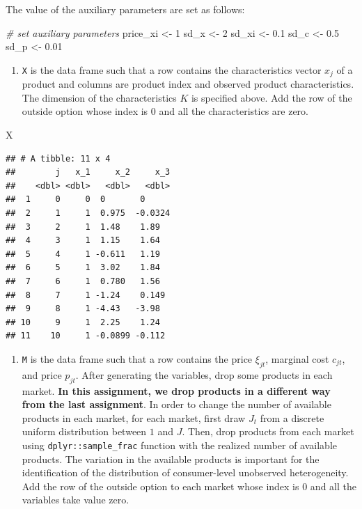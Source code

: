 \documentclass[
]{book}
\newenvironment{Shaded}{\begin{snugshade}}{\end{snugshade}}
\newcommand{\CommentTok}[1]{\textcolor[rgb]{0.56,0.35,0.01}{\textit{#1}}}
\newcommand{\DecValTok}[1]{\textcolor[rgb]{0.00,0.00,0.81}{#1}}
\newcommand{\FloatTok}[1]{\textcolor[rgb]{0.00,0.00,0.81}{#1}}
\newcommand{\NormalTok}[1]{#1}
\newcommand{\OtherTok}[1]{\textcolor[rgb]{0.56,0.35,0.01}{#1}}
\providecommand{\tightlist}{%
  \setlength{\itemsep}{0pt}\setlength{\parskip}{0pt}}
\begin{document}
The value of the auxiliary parameters are set as follows:

\begin{Shaded}
\begin{Highlighting}[]
\CommentTok{\# set auxiliary parameters}
\NormalTok{price\_xi }\OtherTok{\textless{}{-}} \DecValTok{1}
\NormalTok{sd\_x }\OtherTok{\textless{}{-}} \DecValTok{2}
\NormalTok{sd\_xi }\OtherTok{\textless{}{-}} \FloatTok{0.1}
\NormalTok{sd\_c }\OtherTok{\textless{}{-}} \FloatTok{0.5}
\NormalTok{sd\_p }\OtherTok{\textless{}{-}} \FloatTok{0.01}
\end{Highlighting}
\end{Shaded}

\begin{enumerate}
\def\labelenumi{\arabic{enumi}.}
\setcounter{enumi}{1}
\tightlist
\item
  \texttt{X} is the data frame such that a row contains the characteristics vector \(x_{j}\) of a product and columns are product index and observed product characteristics. The dimension of the characteristics \(K\) is specified above. Add the row of the outside option whose index is \(0\) and all the characteristics are zero.
\end{enumerate}

\begin{Shaded}
\begin{Highlighting}[]
\NormalTok{X}
\end{Highlighting}
\end{Shaded}

\begin{verbatim}
## # A tibble: 11 x 4
##        j   x_1     x_2     x_3
##    <dbl> <dbl>   <dbl>   <dbl>
##  1     0     0  0       0     
##  2     1     1  0.975  -0.0324
##  3     2     1  1.48    1.89  
##  4     3     1  1.15    1.64  
##  5     4     1 -0.611   1.19  
##  6     5     1  3.02    1.84  
##  7     6     1  0.780   1.56  
##  8     7     1 -1.24    0.149 
##  9     8     1 -4.43   -3.98  
## 10     9     1  2.25    1.24  
## 11    10     1 -0.0899 -0.112
\end{verbatim}

\begin{enumerate}
\def\labelenumi{\arabic{enumi}.}
\setcounter{enumi}{2}
\tightlist
\item
  \texttt{M} is the data frame such that a row contains the price \(\xi_{jt}\), marginal cost \(c_{jt}\), and price \(p_{jt}\). After generating the variables, drop some products in each market. \textbf{In this assignment, we drop products in a different way from the last assignment}. In order to change the number of available products in each market, for each market, first draw \(J_t\) from a discrete uniform distribution between \(1\) and \(J\). Then, drop products from each market using \texttt{dplyr::sample\_frac} function with the realized number of available products. The variation in the available products is important for the identification of the distribution of consumer-level unobserved heterogeneity. Add the row of the outside option to each market whose index is \(0\) and all the variables take value zero.
\end{enumerate}
\end{document}
